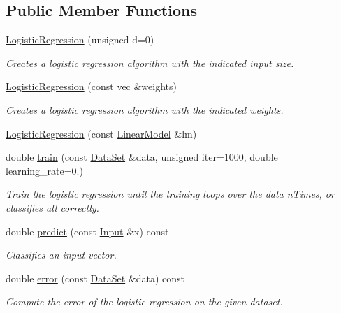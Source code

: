 \subsection*{Public Member Functions}
\begin{DoxyCompactItemize}
\item 
\hyperlink{classhappyml_1_1LogisticRegression_ab3f409e0e3d6c0e95bba0bd86db953ae}{Logistic\+Regression} (unsigned d=0)
\begin{DoxyCompactList}\small\item\em Creates a logistic regression algorithm with the indicated input size. \end{DoxyCompactList}\item 
\hyperlink{classhappyml_1_1LogisticRegression_a42c6f431670db4fea1aff55b3b0cb034}{Logistic\+Regression} (const vec \&weights)
\begin{DoxyCompactList}\small\item\em Creates a logistic regression algorithm with the indicated weights. \end{DoxyCompactList}\item 
\hyperlink{classhappyml_1_1LogisticRegression_afe828c9c1370632d47df5eb0fbc2fe1a}{Logistic\+Regression} (const \hyperlink{classhappyml_1_1LinearModel}{Linear\+Model} \&lm)
\item 
double \hyperlink{classhappyml_1_1LogisticRegression_ae997703343acb56b827ea257775cc971}{train} (const \hyperlink{classhappyml_1_1DataSet}{Data\+Set} \&data, unsigned iter=1000, double learning\+\_\+rate=0.)
\begin{DoxyCompactList}\small\item\em Train the logistic regression until the training loops over the data n\+Times, or classifies all correctly. \end{DoxyCompactList}\item 
double \hyperlink{classhappyml_1_1LogisticRegression_abd9bb137ef99e360fcffcca3187b6703}{predict} (const \hyperlink{namespacehappyml_a03602d1ec49393790b8a0449f40cd01f}{Input} \&x) const 
\begin{DoxyCompactList}\small\item\em Classifies an input vector. \end{DoxyCompactList}\item 
double \hyperlink{classhappyml_1_1LogisticRegression_a40140d6f83cae49ad1472bcf8678da15}{error} (const \hyperlink{classhappyml_1_1DataSet}{Data\+Set} \&data) const 
\begin{DoxyCompactList}\small\item\em Compute the error of the logistic regression on the given dataset. \end{DoxyCompactList}\end{DoxyCompactItemize}
